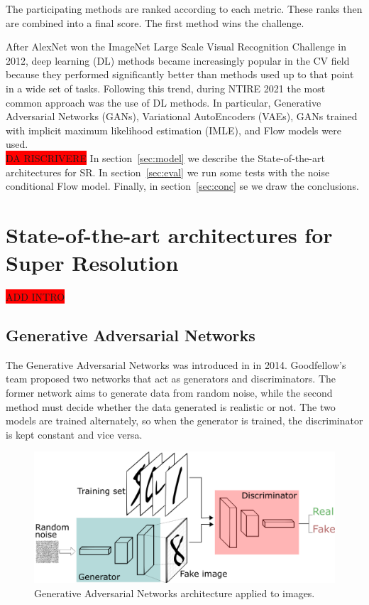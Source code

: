 \documentclass{article}
\begin{document}
\noindent The participating methods are ranked according to each metric. These ranks then are combined into a final score. The first method wins the challenge.

After AlexNet won the ImageNet Large Scale Visual Recognition Challenge in 2012, deep learning (DL) methods became increasingly popular in the CV field because they performed significantly better than methods used up to that point in a wide set of tasks. Following this trend, during NTIRE 2021 the most common approach was the use of DL methods. In particular, Generative Adversarial Networks (GANs), Variational AutoEncoders (VAEs), GANs trained with implicit maximum likelihood estimation (IMLE), and Flow models were used. \\ %

\colorbox{red}{DA RISCRIVERE}
In section~\ref{sec:model} we describe the State-of-the-art architectures for SR. In section~\ref{sec:eval} we run some tests with the noise conditional Flow model. Finally, in section~\ref{sec:conc} se we draw the conclusions.

\section{State-of-the-art architectures for Super Resolution}
\colorbox{red}{ADD INTRO} \\

\subsection{Generative Adversarial Networks}
The Generative Adversarial Networks was introduced in \cite{gans} in 2014. Goodfellow's team proposed two networks that act as generators and discriminators. The former network aims to generate data from random noise, while the second method must decide whether the data generated is realistic or not. The two models are trained alternately, so when the generator is trained, the discriminator is kept constant and vice versa. 
\begin{figure}[h]
    \centering
    \includegraphics[scale=.3]{gan.png}
    \caption{Generative Adversarial Networks architecture applied to images.}
    \label{img:gan}
\end{figure}
\end{document}
